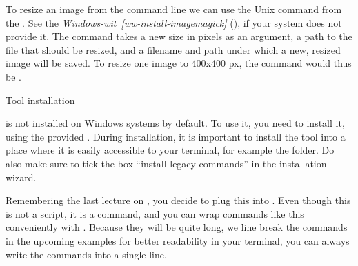 \sphinxAtStartPar
To resize an image from the command line we can use the Unix
command  from the .
See the \textit{Windows-wit}~{\windowswiticoninline}\textit{\ref{ww-install-imagemagick}} {\hyperref[\detokenize{basics/101-110-run2:ww-install-imagemagick}]{}} (), if your system does not provide it.
The command takes a new size in pixels as an argument, a path to the file that should be
resized, and a filename and path under which a new,
resized image will be saved.
To resize one image to 400x400 px, the command would thus be
.

\ignorespaces \begin{windowswit}[label={ww-install-imagemagick}, before title={\thetcbcounter\ }, float, floatplacement=tb, check odd page=true]{Tool installation}
\label{\detokenize{basics/101-110-run2:ww-install-imagemagick}}

\sphinxAtStartPar
{} is not installed on Windows systems by default.
To use it, you need to install it, using the provided .
During installation, it is important to install the tool into a place where it is easily accessible to your terminal, for example the  folder.
Do also make sure to tick the box “install legacy commands” in the installation wizard.


\end{windowswit}

\sphinxAtStartPar
Remembering the last lecture on , you decide to plug this into
. Even though this is not a script, it is a command, and you can wrap
commands like this conveniently with .
Because they will be quite long, we line break the commands in the upcoming examples
for better readability \textendash{} in your terminal, you can always write the commands into
a single line.

